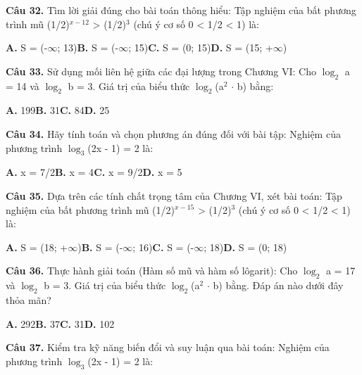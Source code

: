 \documentclass[11pt,a4paper]{article}
\begin{document}
\textbf{\color{primary} Câu 32.} Tìm lời giải đúng cho bài toán thông hiểu: Tập nghiệm của bất phương trình mũ (1/2)$^{x - 12}$ > (1/2)$^3$ (chú ý cơ số 0 < 1/2 < 1) là:\par
\hspace*{1.5em}\textbf{A.} S = (-$\infty$; 13)\quad\quad \textbf{B.} S = (-$\infty$; 15)\quad\quad \textbf{C.} S = (0; 15)\quad\quad \textbf{D.} S = (15; +$\infty$)\par\vspace{2pt}
\textbf{\color{primary} Câu 33.} Sử dụng mối liên hệ giữa các đại lượng trong Chương VI: Cho $\log_2$ a = 14 và $\log_2$ b = 3. Giá trị của biểu thức $\log_2$(a$^2$ $\cdot$ b) bằng:\par
\hspace*{1.5em}\textbf{A.} 199\quad\quad \textbf{B.} 31\quad\quad \textbf{C.} 84\quad\quad \textbf{D.} 25\par\vspace{2pt}
\textbf{\color{primary} Câu 34.} Hãy tính toán và chọn phương án đúng đối với bài tập: Nghiệm của phương trình $\log_3$(2x - 1) = 2 là:\par
\hspace*{1.5em}\textbf{A.} x = 7/2\quad\quad \textbf{B.} x = 4\quad\quad \textbf{C.} x = 9/2\quad\quad \textbf{D.} x = 5\par\vspace{2pt}
\textbf{\color{primary} Câu 35.} Dựa trên các tính chất trọng tâm của Chương VI, xét bài toán: Tập nghiệm của bất phương trình mũ (1/2)$^{x - 15}$ > (1/2)$^3$ (chú ý cơ số 0 < 1/2 < 1) là:\par
\hspace*{1.5em}\textbf{A.} S = (18; +$\infty$)\quad\quad \textbf{B.} S = (-$\infty$; 16)\quad\quad \textbf{C.} S = (-$\infty$; 18)\quad\quad \textbf{D.} S = (0; 18)\par\vspace{2pt}
\textbf{\color{primary} Câu 36.} Thực hành giải toán (Hàm số mũ và hàm số lôgarit): Cho $\log_2$ a = 17 và $\log_2$ b = 3. Giá trị của biểu thức $\log_2$(a$^2$ $\cdot$ b) bằng. Đáp án nào dưới đây thỏa mãn?\par
\hspace*{1.5em}\textbf{A.} 292\quad\quad \textbf{B.} 37\quad\quad \textbf{C.} 31\quad\quad \textbf{D.} 102\par\vspace{2pt}
\textbf{\color{primary} Câu 37.} Kiểm tra kỹ năng biến đổi và suy luận qua bài toán: Nghiệm của phương trình $\log_3$(2x - 1) = 2 là:\par
\end{document}
